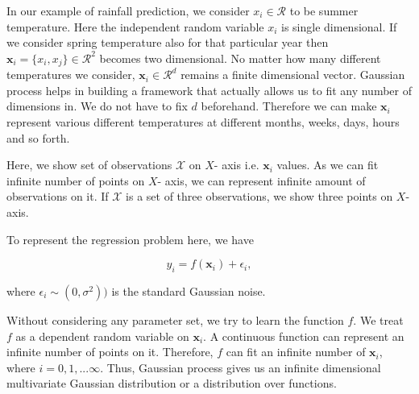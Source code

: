\documentclass[english]{tktltiki}
\begin{document}
In our example of rainfall prediction, we consider $x_i \in \mathcal{R}$ to be summer temperature. Here the independent random variable $x_i$ is single dimensional. If we consider spring temperature also for that particular year then $\mathbf{x}_i = \{x_i, x_j\} \in \mathcal{R}^2$ becomes two dimensional. No matter how many different temperatures we consider, $\mathbf{x}_i \in \mathcal{R}^d$ remains a finite dimensional vector. Gaussian process helps in building a framework that actually allows us to fit any number of dimensions in. We do not have to fix $d$ beforehand. Therefore we can make $\mathbf{x}_i$ represent various different temperatures at different months, weeks, days, hours and so forth.

Here, we show set of observations $\mathcal{X}$ on $X$- axis i.e. $\mathbf{x}_i$ values. As we can fit infinite number of points on $X$- axis, we can represent infinite amount of observations on it. If $\mathcal{X}$ is a set of three observations, we show three points on $X$-axis.

To represent the regression problem here, we have

\begin{equation}
y_i = f(\mathbf{x}_i) + \epsilon_i,
\label{reg_sym_noise}
\end{equation}

where $\epsilon_i \sim (0, \sigma^2))$ is the standard Gaussian noise.

Without considering any parameter set, we try to learn the function $f$. We treat $f$ as a dependent random variable on $\mathbf{x}_i$. A continuous function can represent an infinite number of points on it. Therefore, $f$ can fit an infinite number of $\mathbf{x}_i$, where $i = 0, 1, ... \infty$. Thus, Gaussian process gives us an infinite dimensional multivariate Gaussian distribution or a distribution over functions.
\end{document}
